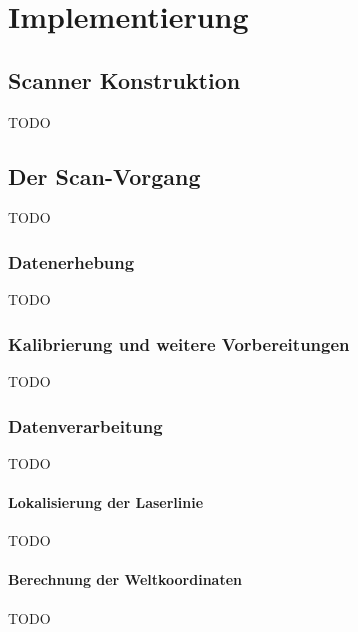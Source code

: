 \chapter{Implementierung}

\section{Scanner Konstruktion}
TODO

\section{Der Scan-Vorgang}
TODO

\subsection{Datenerhebung}
TODO

\subsection{Kalibrierung und weitere Vorbereitungen}
TODO

\subsection{Datenverarbeitung}
TODO

\subsubsection{Lokalisierung der Laserlinie}
TODO

\subsubsection{Berechnung der Weltkoordinaten}
TODO

